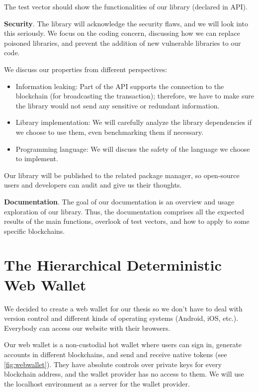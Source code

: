 The test vector should show the functionalities of our library (declared in API).

\bigskip
{\textbf{Security}}. The library will acknowledge the security flaws, and we will look into this seriously. We focus on the coding concern, discussing how we can replace poisoned libraries, and prevent the addition of new vulnerable libraries to our code.

We discuss our properties from different perspectives:

\begin{itemize}
    \item Information leaking: Part of the API supports the connection to the blockchain (for broadcasting the transaction); therefore, we have to make sure the library would not send any sensitive or redundant information.
    \item Library implementation: We will carefully analyze the library dependencies if we choose to use them, even benchmarking them if necessary.
    \item Programming language: We will discuss the safety of the language we choose to implement.
\end{itemize}

Our library will be published to the related package manager, so open-source users and developers can audit and give us their thoughts.

\bigskip
{\textbf{Documentation}}. The goal of our documentation is an overview and usage exploration of our library. Thus, the documentation comprises all the expected results of the main functions, overlook of test vectors, and how to apply to some specific blockchains.



\section{The Hierarchical Deterministic Web Wallet}
We decided to create a web wallet for our thesis so we don’t have to deal with version control and different kinds of operating systems (Android, iOS, etc.). Everybody can access our website with their browsers.

Our web wallet is a non-custodial hot wallet where users can sign in, generate accounts in different blockchains, and send and receive native tokens (see \autoref{fig:webwallet}). They have absolute controls over private keys for every blockchain address, and the wallet provider has no access to them. We will use the localhost environment as a server for the wallet provider.

